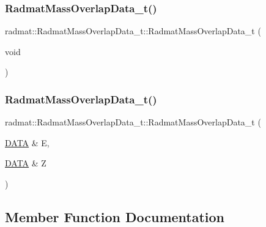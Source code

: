 \subsubsection{\texorpdfstring{RadmatMassOverlapData\_t()}{RadmatMassOverlapData\_t()}\hspace{0.1cm}{\footnotesize\ttfamily [1/2]}}
{\footnotesize\ttfamily radmat\+::\+Radmat\+Mass\+Overlap\+Data\+\_\+t\+::\+Radmat\+Mass\+Overlap\+Data\+\_\+t (\begin{DoxyParamCaption}\item[{void}]{ }\end{DoxyParamCaption})\hspace{0.3cm}{\ttfamily [inline]}}

\mbox{\label{structradmat_1_1RadmatMassOverlapData__t_a8962ecc81be25ed4d5d564e008263ad8}} 
\subsubsection{\texorpdfstring{RadmatMassOverlapData\_t()}{RadmatMassOverlapData\_t()}\hspace{0.1cm}{\footnotesize\ttfamily [2/2]}}
{\footnotesize\ttfamily radmat\+::\+Radmat\+Mass\+Overlap\+Data\+\_\+t\+::\+Radmat\+Mass\+Overlap\+Data\+\_\+t (\begin{DoxyParamCaption}\item[{\mbox{\hyperlink{structradmat_1_1RadmatMassOverlapData__t_ab3de1245b76e79f9867e3af00989e5b6}{D\+A\+TA}} \&}]{E,  }\item[{\mbox{\hyperlink{structradmat_1_1RadmatMassOverlapData__t_ab3de1245b76e79f9867e3af00989e5b6}{D\+A\+TA}} \&}]{Z }\end{DoxyParamCaption})\hspace{0.3cm}{\ttfamily [inline]}}



\subsection{Member Function Documentation}
\mbox{\label{structradmat_1_1RadmatMassOverlapData__t_a0789ab137fc29ffcc3a3917d25aec0fb}} 
